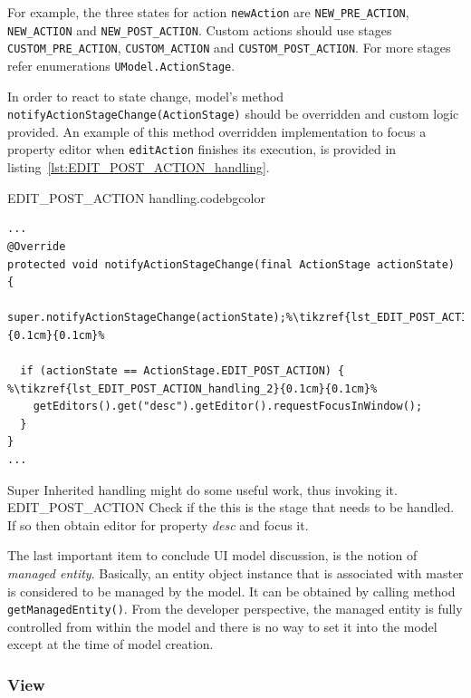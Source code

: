   For example, the three states for action \texttt{newAction} are \texttt{NEW\_PRE\_ACTION}, \texttt{NEW\_ACTION} and \texttt{NEW\_POST\_ACTION}.
  Custom actions should use stages \texttt{CUSTOM\_PRE\_ACTION}, \texttt{CUSTOM\_ACTION} and \texttt{CUSTOM\_POST\_ACTION}. 
  For more stages refer enumerations \texttt{UModel.ActionStage}.
  
  In order to react to state change, model's method \texttt{notifyActionStageChange(ActionStage)} should be overridden and custom logic provided.
  An example of this method overridden implementation to focus a property editor when \texttt{editAction} finishes its execution, is provided in listing~\ref{lst:EDIT_POST_ACTION_handling}.
  
  \begin{code}{EDIT\_POST\_ACTION handling.}{\label{lst:EDIT_POST_ACTION_handling}}{codebgcolor}
    \begin{lstlisting}
...    
@Override    
protected void notifyActionStageChange(final ActionStage actionState) {
  super.notifyActionStageChange(actionState);%\tikzref{lst_EDIT_POST_ACTION_handling_1}{0.1cm}{0.1cm}%
 
  if (actionState == ActionStage.EDIT_POST_ACTION) { %\tikzref{lst_EDIT_POST_ACTION_handling_2}{0.1cm}{0.1cm}%
    getEditors().get("desc").getEditor().requestFocusInWindow();
  }
}
...
    \end{lstlisting}
  \end{code}
    {Super}
    {Inherited handling might do some useful work, thus invoking it.}    
    {EDIT\_POST\_ACTION}
    {Check if the this is the stage that needs to be handled. If so then obtain editor for property \emph{desc} and focus it.}
  
  The last important item to conclude UI model discussion, is the notion of \emph{managed entity}.
  Basically, an entity object instance that is associated with master is considered to be managed by the model.
  It can be obtained by calling method \texttt{getManagedEntity()}.
  From the developer perspective, the managed entity is fully controlled from within the model and there is no way to set it into the model except at the time of model creation.  
  
  \subsubsection{View}
  
